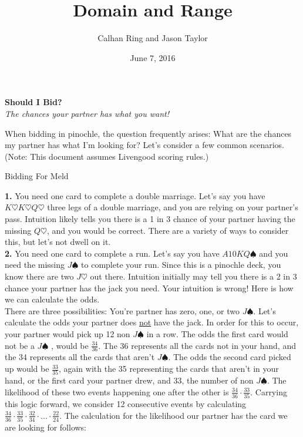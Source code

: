 \documentclass[11pt]{article}
\title{Domain and Range}
\author{Calhan Ring and Jason Taylor}
\date{June 7, 2016}
\begin{document}
\begin{center}
  \textbf{Should I Bid?}\\
  \textit{The chances your partner has what you want!}
\end{center}

When bidding in pinochle, the question frequently arises: What are the chances my partner has what I'm looking for? Let's consider a few common scenarios. (Note: This document assumes Livengood scoring rules.)

\begin{center}
  Bidding For Meld\\
\end{center}

\indent \textbf{1.} You need one card to complete a double marriage. Let's say you have $ K\heartsuit K \heartsuit Q \heartsuit $ three legs of a double marriage, and you are relying on your partner's pass. Intuition likely tells you there is a 1 in 3 chance of your partner having the missing $ Q\heartsuit$, and you would be correct. There are a variety of ways to consider this, but let's not dwell on it. \\
\indent \textbf{2.} You need one card to complete a run. Let's say you have $A10KQ\spadesuit $ and you need the missing $J\spadesuit$ to complete your run. Since this is a pinochle deck, you know there are two $J\heartsuit$ out there. Intuition initially may tell you there is a 2 in 3 chance your partner has the jack you need. Your intuition is wrong! Here is how we can calculate the odds.\\
\indent There are three possibilities: You're partner has zero, one, or two  $ J \spadesuit$. Let's calculate the odds your partner does \underline{not} have the jack. In order for this to occur, your partner would pick up 12 non $ J\spadesuit$ in a row. The odds the first card would not be a $ J\spadesuit$ , would be $ \frac{34}{36} $. The 36 represents all the cards not in your hand, and the 34 represents all the cards that aren't $J\spadesuit$. The odds the second card picked up would be $\frac{33}{35}$, again with the 35 representing the cards that aren't in your hand, or the first card your partner drew, and 33, the number of non $J\spadesuit$. The likelihood of these two events happening one after the other is $\frac{34}{36}\cdot \frac{33}{35}$. Carrying this logic forward, we consider 12 consecutive events by calculating $\frac{34}{36}\cdot \frac{33}{35}\cdot \frac{32}{34}\cdot ... \cdot\frac{22}{24}$. The calculation for the likelihood our partner has the card we are looking for follows:
\end{document}
